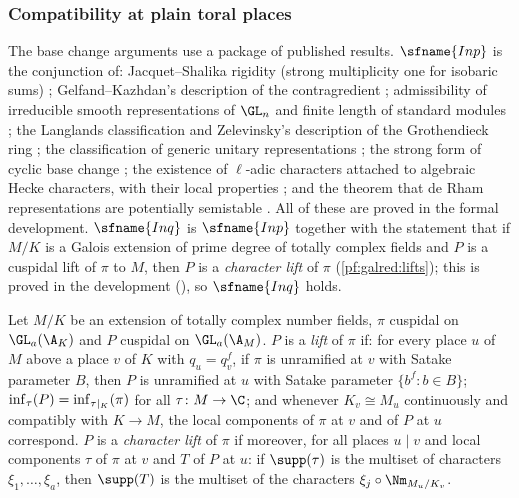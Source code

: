 \subsubsection{Compatibility at plain toral places}\label{sec:pf:galred:R1}

The base change arguments use a package of published results. $\sfname{Inp}$ is the conjunction of: Jacquet--Shalika
rigidity (strong multiplicity one for isobaric sums) \cite{JacquetShalika1981}; Gelfand--Kazhdan's description of the
contragredient \cite{GelfandKazhdan1975}; admissibility of irreducible smooth representations of $\GL_n$ and finite
length of standard modules \cite{BernsteinZelevinsky1977}; the Langlands classification and Zelevinsky's description
of the Grothendieck ring \cite{Zelevinsky1980}; the classification of generic unitary representations
\cite{Tadic1986}; the strong form of cyclic base change \cite{ArthurClozel1989}; the existence of $\ell$-adic
characters attached to algebraic Hecke characters, with their local properties \cite{Serre1968}; and the theorem that
de Rham representations are potentially semistable \cite{Berger2002}. All of these are proved in the formal development. $\sfname{Inq}$ is $\sfname{Inp}$ together with the statement that if
$M/K$ is a Galois extension of prime degree of totally complex fields and $P$ is a cuspidal lift of $\pi$ to $M$, then
$P$ is a \emph{character lift} of $\pi$ (\cref{pf:galred:lifts}); this is proved in the development
(), so $\sfname{Inq}$ holds.

\begin{definition}[Lifts]\label{pf:galred:lifts}
Let $M/K$ be an extension of totally complex number fields, $\pi$ cuspidal on $\GL_a(\A_K)$ and $P$ cuspidal on
$\GL_a(\A_M)$. $P$ is a \emph{lift} of $\pi$ if: for every place $u$ of $M$ above a place $v$ of $K$ with $q_u=q_v^f$, if
$\pi$ is unramified at $v$ with Satake parameter $B$, then $P$ is unramified at $u$ with Satake parameter $\{b^f:b\in
B\}$; $\operatorname{inf}_\tau(P)=\operatorname{inf}_{\tau|_K}(\pi)$ for all $\tau\colon M\to\C$; and whenever $K_v\cong M_u$ continuously
and compatibly with $K\to M$, the local components of $\pi$ at $v$ and of $P$ at $u$ correspond. $P$ is a
\emph{character lift} of $\pi$ if moreover, for all places $u\mid v$ and local components $\tau$ of $\pi$ at $v$ and $T$ of
$P$ at $u$: if $\supp(\tau)$ is the multiset of characters $\xi_1,\dots,\xi_a$, then $\supp(T)$ is the multiset of the
characters $\xi_j\circ\Nm_{M_u/K_v}$.
\end{definition}

